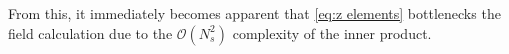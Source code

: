 From this, it immediately becomes apparent that \cref{eq:z elements} bottlenecks the field calculation due to the $\mathcal{O}(N_s^2)$ complexity of the inner product.



